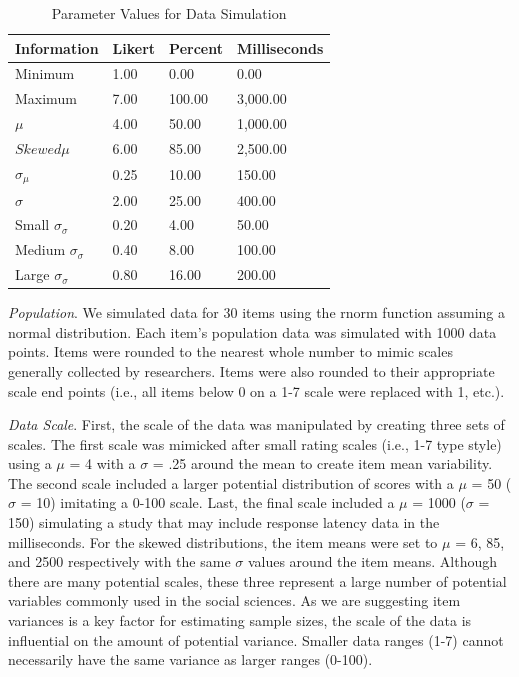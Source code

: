 \documentclass[
  man]{apa7}
\begin{document}
\begin{table}[tbp]

\begin{center}
\begin{threeparttable}

\caption{\label{tab:table-sim}Parameter Values for Data Simulation}

\begin{tabular}{llll}
\toprule
Information & \multicolumn{1}{c}{Likert} & \multicolumn{1}{c}{Percent} & \multicolumn{1}{c}{Milliseconds}\\
\midrule
Minimum & 1.00 & 0.00 & 0.00\\
Maximum & 7.00 & 100.00 & 3,000.00\\
$\mu$ & 4.00 & 50.00 & 1,000.00\\
$Skewed \mu$ & 6.00 & 85.00 & 2,500.00\\
$\sigma_{\mu}$ & 0.25 & 10.00 & 150.00\\
$\sigma$ & 2.00 & 25.00 & 400.00\\
Small $\sigma_{\sigma}$ & 0.20 & 4.00 & 50.00\\
Medium $\sigma_{\sigma}$ & 0.40 & 8.00 & 100.00\\
Large $\sigma_{\sigma}$ & 0.80 & 16.00 & 200.00\\
\bottomrule
\end{tabular}

\end{threeparttable}
\end{center}

\end{table}

\emph{Population}. We simulated data for 30 items using the rnorm function assuming a normal distribution. Each item's population data was simulated with 1000 data points. Items were rounded to the nearest whole number to mimic scales generally collected by researchers. Items were also rounded to their appropriate scale end points (i.e., all items below 0 on a 1-7 scale were replaced with 1, etc.).

\emph{Data Scale}. First, the scale of the data was manipulated by creating three sets of scales. The first scale was mimicked after small rating scales (i.e., 1-7 type style) using a \(\mu\) = 4 with a \(\sigma\) = .25 around the mean to create item mean variability. The second scale included a larger potential distribution of scores with a \(\mu\) = 50 (\(\sigma\) = 10) imitating a 0-100 scale. Last, the final scale included a \(\mu\) = 1000 (\(\sigma\) = 150) simulating a study that may include response latency data in the milliseconds. For the skewed distributions, the item means were set to \(\mu\) = 6, 85, and 2500 respectively with the same \(\sigma\) values around the item means. Although there are many potential scales, these three represent a large number of potential variables commonly used in the social sciences. As we are suggesting item variances is a key factor for estimating sample sizes, the scale of the data is influential on the amount of potential variance. Smaller data ranges (1-7) cannot necessarily have the same variance as larger ranges (0-100).
\end{document}
